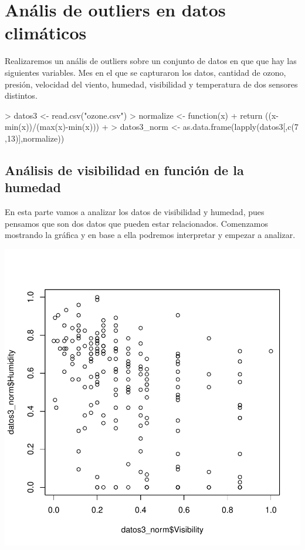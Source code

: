 \documentclass [a4paper] {article}
\begin{document}
\newpage
\section{Anális de outliers en datos climáticos}

Realizaremos un anális de outliers sobre un conjunto de datos en que que hay las siguientes variables.
Mes en el que se capturaron los datos, cantidad de ozono, presión, velocidad del viento, humedad, visibilidad y temperatura de dos sensores distintos.

\begin{Schunk}
\begin{Sinput}
> datos3 <- read.csv("ozone.csv")
> normalize <- function(x){
+   return ((x-min(x))/(max(x)-min(x)))
+ }
> datos3_norm <-  as.data.frame(lapply(datos3[,c(7 ,13)],normalize))
\end{Sinput}
\end{Schunk}

\subsection{Análisis de visibilidad en función de la humedad}
En esta parte vamos a analizar los datos de visibilidad y humedad, pues pensamos que son dos datos que pueden estar relacionados. Comenzamos mostrando 
la gráfica y en base a ella podremos interpretar y empezar a analizar.

\begin{center}
\includegraphics{entrega-datvishum_plot}
\end{center}
\end{document}
